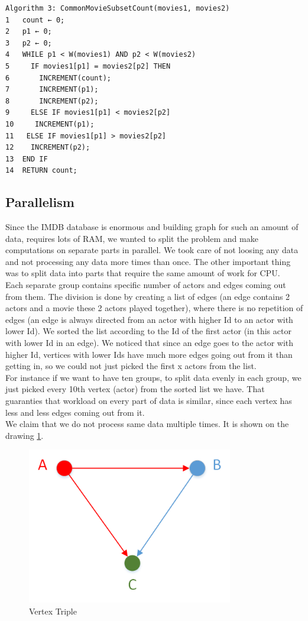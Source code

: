 \begin{verbatim}
Algorithm 3: CommonMovieSubsetCount(movies1, movies2)
1	count ← 0;
2	p1 ← 0;
3	p2 ← 0;
4	WHILE p1 < W(movies1) AND p2 < W(movies2)
5	  IF movies1[p1] = movies2[p2] THEN
6	    INCREMENT(count);
7	    INCREMENT(p1);
8	    INCREMENT(p2);
9	  ELSE IF movies1[p1] < movies2[p2]
10	   INCREMENT(p1);
11	 ELSE IF movies1[p1] > movies2[p2]
12	  INCREMENT(p2);
13	END IF
14	RETURN count;
\end{verbatim}

\label{Parallelism}
\subsection{Parallelism}
Since the IMDB database is enormous and building graph for such an amount of data, requires lots of RAM, we wanted to split the problem and make computations on separate parts in parallel. We took care of not loosing any data and not processing any data more times than once. The other important thing was to split data into parts that require the same amount of work for CPU.
\\
Each separate group contains specific number of actors and edges coming out from them. The division is done by creating a list of edges (an edge contains 2 actors and a movie these 2 actors played together), where there is no repetition of edges (an edge is always directed from an actor with higher Id to an actor with lower Id). We sorted the list according to the Id of the first actor (in this actor with lower Id in an edge). We noticed that since an edge goes to the actor with higher Id, vertices with lower Ids have much more edges going out from it than getting in, so we could not just picked the first x actors from the list. 
\\
For instance if we want to have ten groups, to split data evenly in each group, we just picked every 10th vertex (actor) from the sorted list we have. That guaranties that workload on every part of data is similar, since each vertex has less and less edges coming out from it.
\\
We claim that we do not process same data multiple times. It is shown on the drawing \ref{triple}.

\begin{figure}[ht!]
\centering
\includegraphics[width=90mm]{resources/triple.png}
\caption{Vertex Triple}
\label{triple}
\end{figure}

